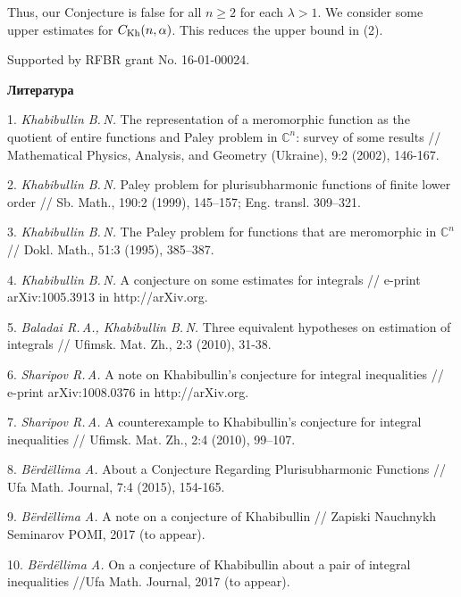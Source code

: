 Thus, our Conjecture is false for all $n\geq 2$ for each  $\lambda >1$. We consider some upper estimates for
$C_{{\rm Kh}}(n,\alpha)$. This reduces the upper bound in (2).

Supported by RFBR grant No. 16-01-00024.


\smallskip \centerline{\bf Литература}\nopagebreak

1. {\it Khabibullin B.\,N.\/} The representation of a meromorphic fun\-c\-t\-i\-on as the quotient of entire functions and Paley problem in $\mathbb C^n$: survey of some results // Mathematical Physics, Analysis, and Geometry (Ukraine), 9:2 (2002), 146-167.

2. {\it Khabibullin B.\,N.\/} Paley problem for plurisubharmonic fun\-c\-t\-i\-ons of finite lower order // Sb. Math., 190:2 (1999), 145--157; Eng. transl. 309–321.

3. {\it Khabibullin B.\,N.\/} The Paley problem for functions that are meromorphic in $\mathbb C^n$ // Dokl. Math., 51:3 (1995), 385–387.

4. {\it Khabibullin B.\,N.\/} A conjecture on some estimates for integr\-als // e-print arXiv:1005.3913 in http://arXiv.org.

5. {\it Baladai R.\,A., Khabibullin B.\,N.\/} Three equivalent hypotheses on estimation of integrals // Ufimsk. Mat. Zh., 2:3 (2010), 31-38.

6. {\it Sharipov R.\,A.\/} A note on Khabibullin's conjecture for integral inequalities // e-print arXiv:1008.0376 in http://arXiv.org.

7. {\it Sharipov R.\,A.\/} A counterexample to Khabibullin's conjecture for integral inequalities // Ufimsk. Mat. Zh., 2:4 (2010), 99–107.

8. {\it B\"erd\"ellima A.\/} About a Conjecture Regarding Plurisubharm\-o\-n\-ic Functions // Ufa Math. Journal, 7:4 (2015), 154-165.


9. {\it B\"erd\"ellima A.\/} A note on a conjecture of Khabibullin //
Zapiski Nauchnykh Seminarov POMI, 2017 (to appear).

10. {\it B\"erd\"ellima A.\/} On a conjecture of Khabibullin about a pair of integral inequalities //Ufa Math. Journal, 2017 (to appear).



